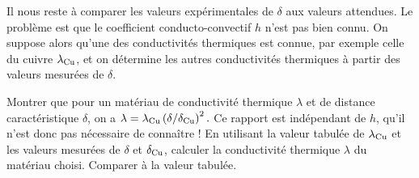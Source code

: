 Il nous reste à comparer les valeurs expérimentales de $\delta$ aux valeurs attendues.
Le problème est que le coefficient conducto-convectif $h$ n’est pas bien connu. On suppose alors qu’une des conductivités thermiques est connue, par exemple celle du cuivre $\lambda_{\rm Cu}$, et on détermine les autres conductivités thermiques à partir des valeurs mesurées de $\delta$.
\begin{protocole}
%
\item
  Montrer que pour un matériau de conductivité thermique $\lambda$ et de distance caractéristique $\delta$, on a
$\lambda = \lambda_{\rm Cu}\left(\delta/\delta_{\rm Cu}\right)^2.$
Ce rapport est indépendant de $h$, qu’il n’est donc pas nécessaire de connaître !
En utilisant la valeur tabulée de $\lambda_{\rm Cu}$ et les valeurs mesurées de $\delta$ et $\delta_{\rm Cu}$, calculer la conductivité thermique $\lambda$ du matériau choisi. Comparer à la valeur tabulée.
\end{protocole}

